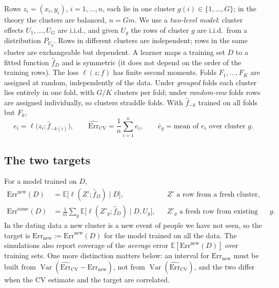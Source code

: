 \documentclass[11pt]{amsart}
\theoremstyle{plain}
\theoremstyle{definition}
\theoremstyle{remark}
\newcommand{\Var}{\operatorname{Var}}
\newcommand{\E}{\mathbb{E}}
\newcommand{\CV}{\widehat{\mathrm{Err}}_{\mathrm{CV}}}
\newcommand{\Errnew}{\mathrm{Err}_{\mathrm{new}}}
\begin{document}
Rows $z_i=(x_i,y_i)$, $i=1,\dots,n$, each lie in one cluster $g(i)\in\{1,\dots,G\}$; in the theory the clusters are balanced, $n=Gm$. We use a \emph{two-level model}: cluster effects $U_1,\dots,U_G$ are i.i.d., and given $U_g$ the rows of cluster $g$ are i.i.d.\ from a distribution $P_{U_g}$. Rows in different clusters are independent; rows in the same cluster are exchangeable but dependent. A learner maps a training set $D$ to a fitted function $\hat f_D$ and is symmetric (it does not depend on the order of the training rows). The loss $\ell(z;f)$ has finite second moments. Folds $F_1,\dots,F_K$ are assigned at random, independently of the data. Under \emph{grouped} folds each cluster lies entirely in one fold, with $G/K$ clusters per fold; under \emph{random-row} folds rows are assigned individually, so clusters straddle folds. With $\hat f_{-k}$ trained on all folds but $F_k$,
\[
e_i=\ell\bigl(z_i;\hat f_{-k(i)}\bigr),\qquad \CV=\frac1n\sum_{i=1}^n e_i,\qquad \bar e_g=\text{mean of } e_i \text{ over cluster } g .
\]

\subsection*{The two targets} For a model trained on $D$,
\begin{align*}
\mathrm{Err}^{\mathrm{new}}(D)&=\E\bigl[\ell(Z';\hat f_D)\mid D\bigr], && Z' \text{ a row from a fresh cluster},\\
\mathrm{Err}^{\mathrm{same}}(D)&=\frac1G\sum_{g}\E\bigl[\ell(Z'_g;\hat f_D)\mid D,U_g\bigr], && Z'_g \text{ a fresh row from existing cluster } g.
\end{align*}
In the dating data a new cluster is a new event of people we have not seen, so the target is $\Errnew:=\mathrm{Err}^{\mathrm{new}}(D)$ for the model trained on all the data. The simulations also report coverage of the \emph{average} error $\E[\mathrm{Err}^{\mathrm{new}}(D)]$ over training sets. One more distinction matters below: an interval for $\Errnew$ must be built from $\Var(\CV-\Errnew)$, not from $\Var(\CV)$, and the two differ when the CV estimate and the target are correlated.
\end{document}
